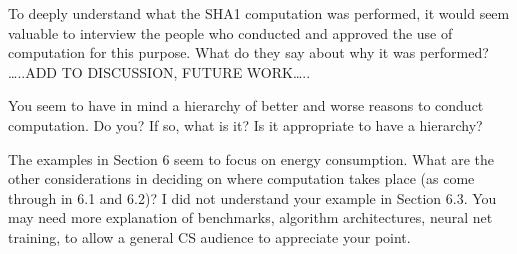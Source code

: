 \documentclass[sigconf]{acmart}
\begin{document}
To deeply understand what the SHA1 computation was performed, it would seem valuable to interview the people who conducted and approved the use of computation for this purpose. What do they say about why it was performed? 
\ldots{}..ADD TO DISCUSSION, FUTURE WORK\ldots{}..

You seem to have in mind a hierarchy of better and worse reasons to conduct computation. Do you? If so, what is it? Is it appropriate to have a hierarchy?

The examples in Section 6 seem to focus on energy consumption. What are the other considerations in deciding on where computation takes place (as come through in 6.1 and 6.2)? I did not understand your example in Section 6.3. You may need more explanation of benchmarks, algorithm architectures, neural net training, to allow a general CS audience to appreciate your point.
\end{document}
